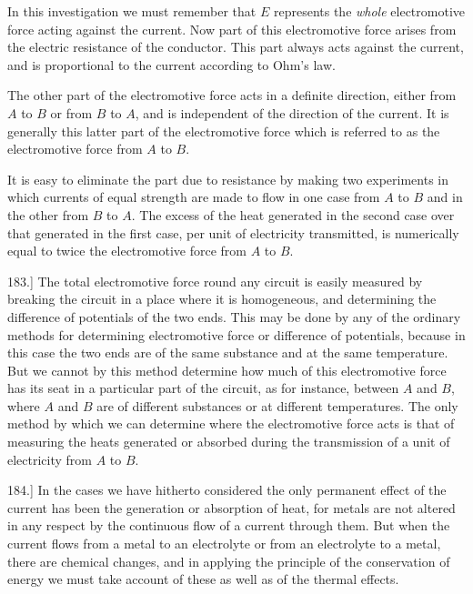 \documentclass[12pt,oneside]{book}[2021/10/04]
\newcommand{\article}[1]{\phantomsection \label{art:#1}{#1.]}}
\newcommand{\¬}{\hphantom{0}}
\begin{document}
In this investigation we must remember that \(E\) represents the
\textit{whole} electromotive force acting against the current. Now part of
this electromotive force arises from the electric resistance of the
conductor. This part always acts against the current, and is proportional
to the current according to Ohm's law.

The other part of the electromotive force acts in a definite direction,
either from \(A\) to \(B\) or from \(B\) to \(A\), and is independent of the
direction of the current. It is generally this latter part of the
electromotive force which is referred to as the electromotive force
from \(A\) to \(B\).

It is easy to eliminate the part due to resistance by making two
experiments in which currents of equal strength are made to flow
in one case from \(A\) to \(B\) and in the other from \(B\) to \(A\). The excess
of the heat generated in the second case over that generated in the
first case, per unit of electricity transmitted, is numerically equal
to twice the electromotive force from \(A\) to \(B\).

\article{183} The total electromotive force round any circuit is easily
measured by breaking the circuit in a place where it is homogeneous,
and determining the difference of potentials of the two ends.
This may be done by any of the ordinary methods for determining
electromotive force or difference of potentials, because in this case
the two ends are of the same substance and at the same temperature.
But we cannot by this method determine how much of this
electromotive force has its seat in a particular part of the circuit,
as for instance, between \(A\) and \(B\), where \(A\) and \(B\) are of different
substances or at different temperatures. The only method by which
we can determine where the electromotive force acts is that of
measuring the heats generated or absorbed during the transmission
of a unit of electricity from \(A\) to \(B\).

\article{184} In the cases we have hitherto considered the only permanent
effect of the current has been the generation or absorption
of heat, for metals are not altered in any respect by the continuous
flow of a current through them. But when the current flows from
a metal to an electrolyte or from an electrolyte to a metal, there
are chemical changes, and in applying the principle of the conservation
of energy we must take account of these as well as of the
thermal effects.
\end{document}
